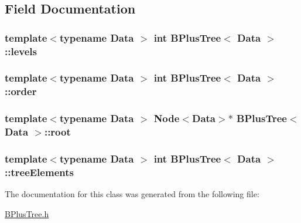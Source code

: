 \subsection{Field Documentation}
\subsubsection[{\texorpdfstring{levels}{levels}}]{\setlength{\rightskip}{0pt plus 5cm}template$<$typename Data $>$ int {\bf B\+Plus\+Tree}$<$ {\bf Data} $>$\+::levels}\hypertarget{classBPlusTree_a54b32b4ed373559b4e0821ffced9de86}{}\label{classBPlusTree_a54b32b4ed373559b4e0821ffced9de86}
\subsubsection[{\texorpdfstring{order}{order}}]{\setlength{\rightskip}{0pt plus 5cm}template$<$typename Data $>$ int {\bf B\+Plus\+Tree}$<$ {\bf Data} $>$\+::order}\hypertarget{classBPlusTree_a5c36dd5810d348dc87c106323311b1c5}{}\label{classBPlusTree_a5c36dd5810d348dc87c106323311b1c5}
\subsubsection[{\texorpdfstring{root}{root}}]{\setlength{\rightskip}{0pt plus 5cm}template$<$typename Data $>$ {\bf Node}$<${\bf Data}$>$$\ast$ {\bf B\+Plus\+Tree}$<$ {\bf Data} $>$\+::root}\hypertarget{classBPlusTree_a902548acb47c9268aec2419341ea472a}{}\label{classBPlusTree_a902548acb47c9268aec2419341ea472a}
\subsubsection[{\texorpdfstring{tree\+Elements}{treeElements}}]{\setlength{\rightskip}{0pt plus 5cm}template$<$typename Data $>$ int {\bf B\+Plus\+Tree}$<$ {\bf Data} $>$\+::tree\+Elements}\hypertarget{classBPlusTree_af012b8daf299c534b1b439d20b5343f6}{}\label{classBPlusTree_af012b8daf299c534b1b439d20b5343f6}


The documentation for this class was generated from the following file\+:\begin{DoxyCompactItemize}
\item 
\hyperlink{BPlusTree_8h}{B\+Plus\+Tree.\+h}\end{DoxyCompactItemize}
